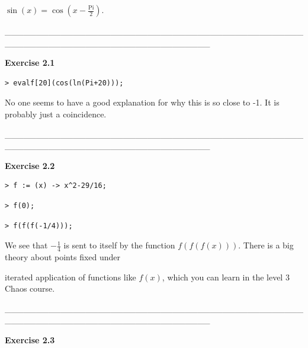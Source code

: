 \documentclass{article}
\begin{document}
\begin{Maple Normal}

$\sin (x)=\cos (x -\frac{\mathrm{Pi}}{2})$.
\end{Maple Normal}
\begin{Maple Normal}
\_\_\_\_\_\_\_\_\_\_\_\_\_\_\_\_\_\_\_\_\_\_\_\_\_\_\_\_\_\_\_\_\_\_\_\_\_\_\_\_\_\_\_\_\_\_\_\_\_\_\_\_\_\_\_\_\_\_\_\_\_\_\_\_\_\_\_\_\_\_\_\_\_\_\_\_\_\_\_\_\_
\end{Maple Normal}
\begin{Maple Heading 2}
\textbf{Exercise 2.1}
\end{Maple Heading 2}
\begin{lstlisting}
> evalf[20](cos(ln(Pi+20)));
\end{lstlisting}
\begin{Maple Normal}
No one seems to have a good explanation for why this is so close to -1.  It is probably just a coincidence.
\end{Maple Normal}
\begin{Maple Normal}
\_\_\_\_\_\_\_\_\_\_\_\_\_\_\_\_\_\_\_\_\_\_\_\_\_\_\_\_\_\_\_\_\_\_\_\_\_\_\_\_\_\_\_\_\_\_\_\_\_\_\_\_\_\_\_\_\_\_\_\_\_\_\_\_\_\_\_\_\_\_\_\_\_\_\_\_\_\_\_\_\_
\end{Maple Normal}
\begin{Maple Heading 2}
\textbf{Exercise 2.2}
\end{Maple Heading 2}
\begin{lstlisting}
> f := (x) -> x^2-29/16;
\end{lstlisting}
\begin{lstlisting}
> f(0);
\end{lstlisting}
\begin{lstlisting}
> f(f(f(-1/4)));
\end{lstlisting}
\begin{Maple Normal}
We see that 
$-\frac{1}{4}$ is sent to itself by the function 
$f (f (f (x)))$.  There is a big theory about points fixed under
\end{Maple Normal}
\begin{Maple Normal}
iterated application of functions like 
$f (x)$, which you can learn in the level 3 Chaos course.
\end{Maple Normal}
\begin{Maple Normal}
\_\_\_\_\_\_\_\_\_\_\_\_\_\_\_\_\_\_\_\_\_\_\_\_\_\_\_\_\_\_\_\_\_\_\_\_\_\_\_\_\_\_\_\_\_\_\_\_\_\_\_\_\_\_\_\_\_\_\_\_\_\_\_\_\_\_\_\_\_\_\_\_\_\_\_\_\_\_\_\_\_
\end{Maple Normal}
\begin{Maple Heading 2}
\textbf{Exercise 2.3}
\end{Maple Heading 2}
\end{document}
